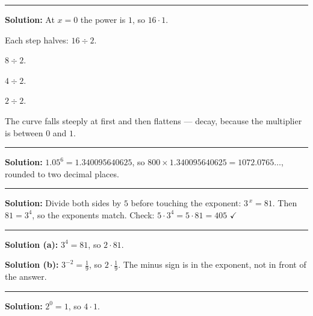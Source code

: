\documentclass[12pt]{article}
\begin{document}
\vspace{0.2cm}\noindent\rule{\linewidth}{0.2pt}


\textbf{Solution:} At $x = 0$ the power is $1$, so $16 \cdot 1$. 

Each step halves: $16 \div 2$. 

$8 \div 2$. 

$4 \div 2$. 

$2 \div 2$. 

The curve falls steeply at first and then flattens --- decay, because the multiplier is between $0$ and $1$.

\vspace{0.2cm}\noindent\rule{\linewidth}{0.2pt}


\textbf{Solution:} $1.05^6 = 1.340095640625$, so $800 \times 1.340095640625 = 1072.0765\ldots$, rounded to two decimal places. 

\vspace{0.2cm}\noindent\rule{\linewidth}{0.2pt}


\textbf{Solution:} Divide both sides by $5$ before touching the exponent: $3^{\,x} = 81$. Then $81 = 3^4$, so the exponents match. Check: $5 \cdot 3^4 = 5 \cdot 81 = 405$ $\checkmark$ 

\vspace{0.2cm}\noindent\rule{\linewidth}{0.2pt}


\textbf{Solution (a):} $3^4 = 81$, so $2 \cdot 81$. 

\textbf{Solution (b):} $3^{-2} = \frac{1}{9}$, so $2 \cdot \frac{1}{9}$. The minus sign is in the exponent, not in front of the answer. 

\vspace{0.2cm}\noindent\rule{\linewidth}{0.2pt}


\textbf{Solution:} $2^0 = 1$, so $4 \cdot 1$. 
\end{document}
